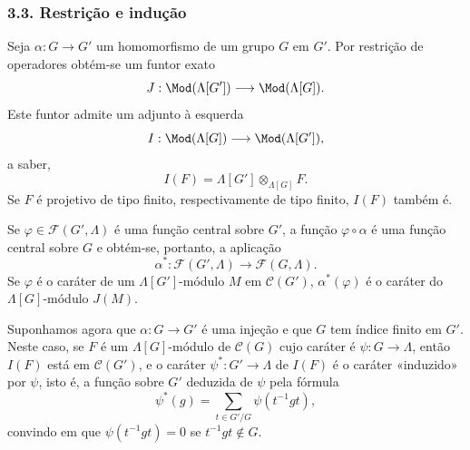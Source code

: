 \subsubsection*{3.3. Restrição e indução}

Seja $\alpha:G\to G'$ um homomorfismo de um grupo $G$ em $G'$. Por restrição de operadores obtém-se um funtor exato
\[
J:\Mod(\Lambda[G'])\longrightarrow\Mod(\Lambda[G]).
\]
Este funtor admite um adjunto à esquerda
\[
I:\Mod(\Lambda[G])\longrightarrow\Mod(\Lambda[G']),
\]
a saber,
\[
I(F)=\Lambda[G']\otimes_{\Lambda[G]}F.
\]
Se $F$ é projetivo de tipo finito, respectivamente de tipo finito, $I(F)$ também é.

Se $\varphi\in\mathcal F(G',\Lambda)$ é uma função central sobre $G'$, a função $\varphi\circ\alpha$ é uma função central sobre $G$ e obtém-se, portanto, a aplicação
\[
\alpha^*: \mathcal F(G',\Lambda)\longrightarrow\mathcal F(G,\Lambda).
\]
Se $\varphi$ é o caráter de um $\Lambda[G']$-módulo $M$ em $\mathcal C(G')$, $\alpha^*(\varphi)$ é o caráter do $\Lambda[G]$-módulo $J(M)$.

Suponhamos agora que $\alpha:G\to G'$ é uma injeção e que $G$ tem índice finito em $G'$. Neste caso, se $F$ é um $\Lambda[G]$-módulo de $\mathcal C(G)$ cujo caráter é $\psi:G\to\Lambda$, então $I(F)$ está em $\mathcal C(G')$, e o caráter $\psi^*:G'\to\Lambda$ de $I(F)$ é o caráter «induzido» por $\psi$, isto é, a função sobre $G'$ deduzida de $\psi$ pela fórmula
\[
\psi^*(g)=\sum_{t\in G'/G}\psi(t^{-1}gt),
\tag{3.3.1}
\]
convindo em que $\psi(t^{-1}gt)=0$ se $t^{-1}gt\notin G$.
